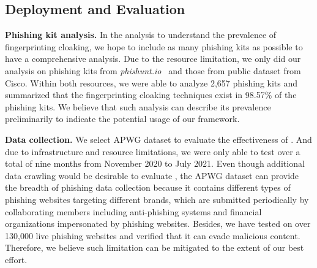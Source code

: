 \subsection{\spartacus Deployment and Evaluation}

\noindent
\textbf{Phishing kit analysis.}
In the analysis to understand the prevalence of fingerprinting cloaking, we hope to include as many phishing kits as possible to have a comprehensive analysis.
Due to the resource limitation, we only did our analysis on phishing kits from \emph{phishunt.io}~\cite{phishunt} and those from public dataset from Cisco.
Within both resources, we were able to analyze 2,657 phishing kits and summarized that the fingerprinting cloaking techniques exist in 98.57\% of the phishing kits.
We believe that such analysis can describe its prevalence preliminarily to indicate the potential usage of our \spartacus framework.


\noindent
\textbf{Data collection.}
We select APWG dataset to evaluate the effectiveness of \spartacus.
And due to infrastructure and resource limitations, we were only able to test \spartacus over a total of nine months from November 2020 to July 2021.
Even though additional data crawling would be desirable to evaluate \spartacus,
the APWG dataset can provide the breadth of phishing data collection because it contains different types of phishing websites targeting different brands, which are submitted periodically by collaborating members including anti-phishing systems and financial organizations impersonated by phishing websites.
Besides, we have tested \spartacus on over 130,000 live phishing websites and verified that it can evade malicious content.
Therefore, we believe such limitation can be mitigated to the extent of our best effort.

